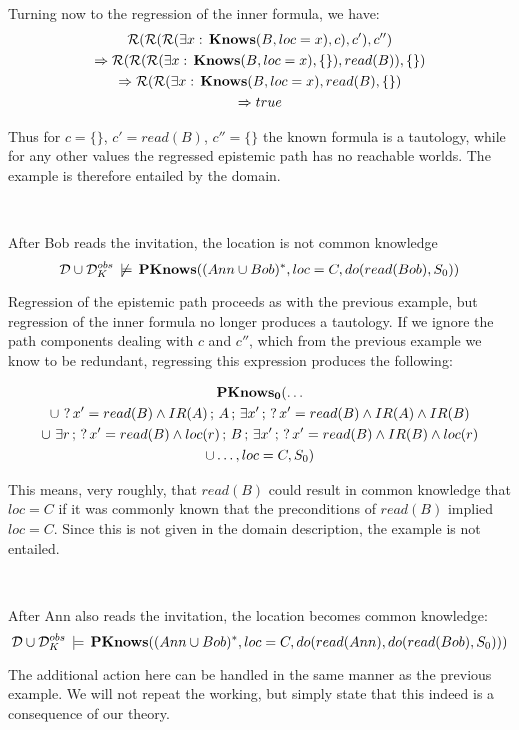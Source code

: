 Turning now to the regression of the inner formula, we have:\begin{gather*}
\mathcal{R}(\mathcal{R}(\mathcal{R}(\exists x:\,\mathbf{Knows}(B,loc=x),c),c'),c'')\\
\Rightarrow\mathcal{R}(\mathcal{R}(\mathcal{R}(\exists x:\,\mathbf{Knows}(B,loc=x),\{\}),read(B)),\{\})\\
\Rightarrow\mathcal{R}(\mathcal{R}(\exists x:\,\mathbf{Knows}(B,loc=x),read(B),\{\})\\
\Rightarrow true\end{gather*}


Thus for $c=\{\}$, $c'=read(B)$, $c''=\{\}$ the known formula is
a tautology, while for any other values the regressed epistemic path
has no reachable worlds. The example is therefore entailed by the
domain.

~

\begin{example}
After Bob reads the invitation, the location is not common knowledge\[
\mathcal{D}\cup\mathcal{D}_{K}^{obs}\,\not\models\,\mathbf{PKnows}((Ann\cup Bob)^{*},loc=C,do(read(Bob),S_{0}))\]

\end{example}
Regression of the epistemic path proceeds as with the previous example,
but regression of the inner formula no longer produces a tautology.
If we ignore the path components dealing with $c$ and $c''$, which
from the previous example we know to be redundant, regressing this
expression produces the following:

\begin{multline*}
\mathbf{PKnows_{0}}(\dots\\
\cup\,\,?\, x'=read(B)\wedge IR(A)\,;\, A\,;\,\exists x'\,;\,?\, x'=read(B)\wedge IR(A)\wedge IR(B)\\
\cup\,\,\exists r\,;\,?\, x'=read(B)\wedge loc(r)\,;\, B\,;\,\exists x'\,;\,?\, x'=read(B)\wedge IR(B)\wedge loc(r)\\
\cup\dots,loc=C,S_{0})\end{multline*}


This means, very roughly, that $read(B)$ could result in common knowledge
that $loc=C$ if it was commonly known that the preconditions of $read(B)$
implied $loc=C$. Since this is not given in the domain description,
the example is not entailed.

~

\begin{example}
After Ann also reads the invitation, the location becomes common knowledge:\[
\mathcal{D}\cup\mathcal{D}_{K}^{obs}\,\models\,\mathbf{PKnows}((Ann\cup Bob)^{*},loc=C,do(read(Ann),do(read(Bob),S_{0})))\]

\end{example}
The additional action here can be handled in the same manner as the
previous example. We will not repeat the working, but simply state
that this indeed is a consequence of our theory.


